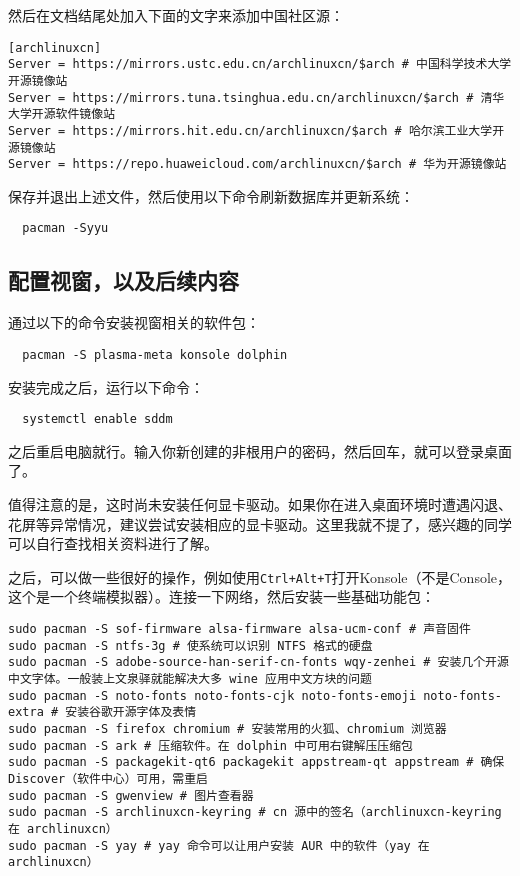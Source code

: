 \documentclass[../main.tex]{subfiles}
\begin{document}
然后在文档结尾处加入下面的文字来添加中国社区源：
\begin{lstlisting}
[archlinuxcn]
Server = https://mirrors.ustc.edu.cn/archlinuxcn/$arch # 中国科学技术大学开源镜像站
Server = https://mirrors.tuna.tsinghua.edu.cn/archlinuxcn/$arch # 清华大学开源软件镜像站
Server = https://mirrors.hit.edu.cn/archlinuxcn/$arch # 哈尔滨工业大学开源镜像站
Server = https://repo.huaweicloud.com/archlinuxcn/$arch # 华为开源镜像站
\end{lstlisting}

保存并退出上述文件，然后使用以下命令刷新数据库并更新系统：
\begin{lstlisting}
  pacman -Syyu
\end{lstlisting}

\subsection{配置视窗，以及后续内容}

通过以下的命令安装视窗相关的软件包：
\begin{lstlisting}
  pacman -S plasma-meta konsole dolphin
\end{lstlisting}
安装完成之后，运行以下命令：
\begin{lstlisting}
  systemctl enable sddm
\end{lstlisting}
之后重启电脑就行。输入你新创建的非根用户的密码，然后回车，就可以登录桌面了。

值得注意的是，这时尚未安装任何显卡驱动。如果你在进入桌面环境时遭遇闪退、花屏等异常情况，建议尝试安装相应的显卡驱动。这里我就不提了，感兴趣的同学可以自行查找相关资料进行了解。

之后，可以做一些很好的操作，例如使用\texttt{Ctrl+Alt+T}打开Konsole（不是Console，这个是一个终端模拟器）。连接一下网络，然后安装一些基础功能包：
\begin{lstlisting}
sudo pacman -S sof-firmware alsa-firmware alsa-ucm-conf # 声音固件
sudo pacman -S ntfs-3g # 使系统可以识别 NTFS 格式的硬盘
sudo pacman -S adobe-source-han-serif-cn-fonts wqy-zenhei # 安装几个开源中文字体。一般装上文泉驿就能解决大多 wine 应用中文方块的问题
sudo pacman -S noto-fonts noto-fonts-cjk noto-fonts-emoji noto-fonts-extra # 安装谷歌开源字体及表情
sudo pacman -S firefox chromium # 安装常用的火狐、chromium 浏览器
sudo pacman -S ark # 压缩软件。在 dolphin 中可用右键解压压缩包
sudo pacman -S packagekit-qt6 packagekit appstream-qt appstream # 确保 Discover（软件中心）可用，需重启
sudo pacman -S gwenview # 图片查看器
sudo pacman -S archlinuxcn-keyring # cn 源中的签名（archlinuxcn-keyring 在 archlinuxcn）
sudo pacman -S yay # yay 命令可以让用户安装 AUR 中的软件（yay 在 archlinuxcn）
\end{lstlisting}
\end{document}
